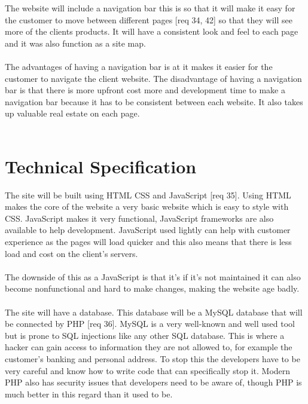 \documentclass{article}
\begin{document}
The website will include a navigation bar this is so that it will make it easy for the customer to move between different pages [req 34, 42] so that they will see more of the clients products. It will have a consistent look and feel to each page and it was also function as a site map.
\\
\\

The advantages of having a navigation bar is at it makes it easier for the customer to navigate the client website. The disadvantage of having a navigation bar is that there is more upfront cost more and development time to make a navigation bar because it has to be consistent between each website. It also takes up valuable real estate on each page.
 \\
\\

\section{Technical Specification}


The site will be built using HTML CSS and JavaScript [req 35]. Using HTML makes the core of the website a very basic website which is easy to style with CSS. JavaScript makes it very functional, JavaScript frameworks are also available to help development. JavaScript used lightly can help with customer experience as the pages will load quicker and this also means that there is less load and cost on the client's servers.
\\
\\
The downside of this as a JavaScript is that it's if it's not maintained it can also become nonfunctional and hard to make changes, making the website age badly.
\\
\\
The site will have a database. This database will be a MySQL database that will be connected by PHP [req 36]. MySQL is a very well-known and well used tool but is prone to SQL injections like any other SQL database.  This is where a hacker can gain access to information they are not allowed to, for example the customer's banking and personal address. To stop this the developers have to be very careful and know how to write code that can specifically stop it. Modern PHP also has security issues that developers need to be aware of, though PHP is much better in this regard than it used to be.
\\
\\
\end{document}
